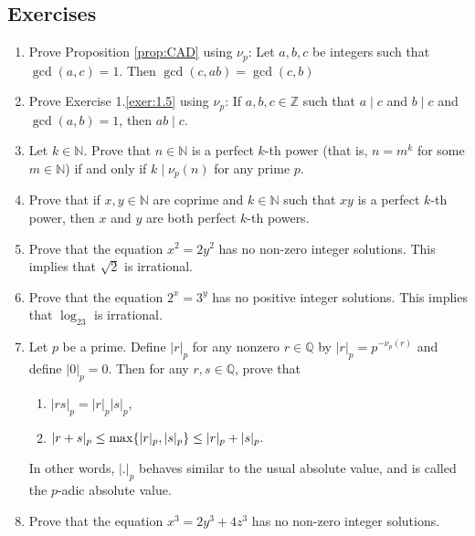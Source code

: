 \documentclass{article}
\def\Z{{\mathbb Z}}
\def\N{{\mathbb N}}
\def\Q{{\mathbb Q}}
\def\Z{{\mathbb Z}}
\def\Q{{\mathbb Q}}
\def\max{{\rm max}}
\begin{document}
\subsection*{Exercises}
\begin{enumerate}[\thesection .1]
        \item Prove Proposition \ref{prop:CAD} using $\nu_p$: Let $a,b,c$ be integers such that $\gcd(a,c) = 1$. Then $\gcd(c, ab) = \gcd(c, b)$
    \item Prove Exercise 1.\ref{exer:1.5} using $\nu_p$: If $a,b,c\in\Z$ such that $a\mid c$ and $b\mid c$ and $\gcd(a,b) = 1$, then $ab\mid c$.
    \item Let $k\in\N$. Prove that $n\in\N$ is a perfect $k$-th power (that is, $n = m^k$ for some $m\in\N$) if and only if $k\mid\nu_p(n)$ for any prime $p$.
    \item Prove that if $x,y\in\N$ are coprime and $k\in\N$ such that $xy$ is a perfect $k$-th power, then $x$ and $y$ are both perfect $k$-th powers.
    \item Prove that the equation $x^2 = 2y^2$ has no non-zero integer solutions. This implies that $\sqrt{2}$ is irrational.
    \item Prove that the equation $2^x = 3^y$ has no positive integer solutions. This implies that $\log_23$ is irrational.
    \item Let $p$ be a prime. Define $|r|_p$ for any nonzero $r\in\Q$ by $|r|_p = p^{-\nu_p(r)}$ and define $|0|_p = 0$. Then for any $r,s\in\Q$, prove that
    \begin{enumerate}
        \item $|rs|_p = |r|_p|s|_p$,
        \item $|r+s|_p \leq \max\{|r|_p,|s|_p\}\leq |r|_p + |s|_p.$
    \end{enumerate}
    In other words, $|.|_p$ behaves similar to the usual absolute value, and is called the $p$-adic absolute value.
    \item Prove that the equation $x^3 = 2y^3 + 4z^3$ has no non-zero integer solutions.
\end{enumerate}
\end{document}
